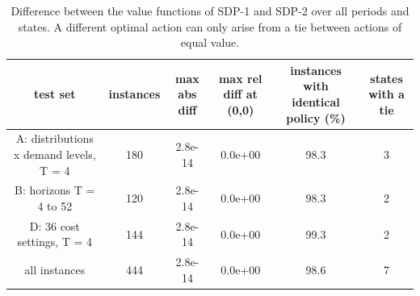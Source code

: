 \begin{table}[H]
\centering
\caption{Difference between the value functions of SDP-1 and SDP-2 over all periods and states. A different optimal action can only arise from a tie between actions of equal value.}
\label{tab:test1_Q1_equality}
\begin{tabular}{cccccc}
\toprule
test set & instances & max abs diff & max rel diff at (0,0) & instances with identical policy (\%) & states with a tie \\
\midrule
A: distributions x demand levels, T = 4 & 180 & 2.8e-14 & 0.0e+00 & 98.3 & 3 \\
B: horizons T = 4 to 52 & 120 & 2.8e-14 & 0.0e+00 & 98.3 & 2 \\
D: 36 cost settings, T = 4 & 144 & 2.8e-14 & 0.0e+00 & 99.3 & 2 \\
all instances & 444 & 2.8e-14 & 0.0e+00 & 98.6 & 7 \\
\bottomrule
\end{tabular}
\end{table}